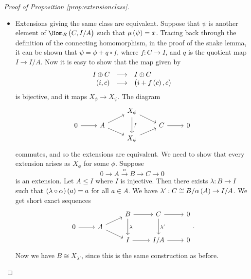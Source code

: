 \begin{proof}[Proof of Proposition \ref{prop:extensionclass}]
\begin{itemize}
From Lemma \ref{lem:extensionclass}, there is a commuting square
$$
\begin{tikzcd}[row sep=tiny]
\Hom_R\br{C, C} \arrow{dr}{\eta} \arrow{dd}[swap]{\overline{\phi}} & \\
& \Ext_R^1\br{C, A} \\
\Hom_R\br{C, I / A} \arrow{ur}[swap]{\mu} &
\end{tikzcd}.
$$
For $ f \in \Hom_R\br{C, C} $, $ \overline{\phi}\br{f} = \phi \circ f $. So the class of the extension
$$ 0 \to A \to B \to C \to 0 $$
is $ \eta\br{\id_C} = \mu\br{\phi \circ \id_C} = \mu\br{\phi} = x $.
\item Extensions giving the same class are equivalent. Suppose that $ \psi $ is another element of $ \Hom_R\br{C, I / A} $ such that $ \mu\br{\psi} = x $. Tracing back through the definition of the connecting homomorphism, in the proof of the snake lemma, it can be shown that $ \psi = \phi + q \circ f $, where $ f : C \to I $, and $ q $ is the quotient map $ I \to I / A $. Now it is easy to show that the map given by
$$ \function{I \oplus C}{I \oplus C}{\br{i, c}}{\br{i + f\br{c}, c}} $$
is bijective, and it maps $ X_\phi \to X_\psi $. The diagram
$$
\begin{tikzcd}[row sep=tiny]
& & X_\phi \arrow{dr} \arrow{dd}{f} & & \\
0 \arrow{r} & A \arrow{ur} \arrow{dr} & & C \arrow{r} & 0 \\
& & X_\psi \arrow{ur} & &
\end{tikzcd}
$$
commutes, and so the extensions are equivalent. We need to show that every extension arises as $ X_\phi $ for some $ \phi $. Suppose
$$ 0 \to A \xrightarrow{\alpha} B \to C \to 0 $$
is an extension. Let $ A \le I $ where $ I $ is injective. Then there exists $ \lambda : B \to I $ such that $ \br{\lambda \circ \alpha}\br{a} = a $ for all $ a \in A $. We have $ \lambda' : C \cong B / \alpha\br{A} \to I / A $. We get short exact sequences
$$
\begin{tikzcd}[row sep=tiny]
& & B \arrow{r} \arrow{dd}{\lambda} & C \arrow{r} \arrow{dd}{\lambda'} & 0 \\
0 \arrow{r} & A \arrow{ur} \arrow{dr} & & \\
& & I \arrow{r} & I / A \arrow{r} & 0
\end{tikzcd}.
$$
Now we have $ B \cong X_{\lambda'} $, since this is the same construction as before.



\end{itemize}
\end{proof}
